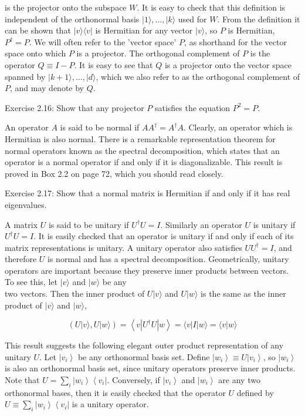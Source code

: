 \documentclass[
	11pt, %
	fleqn, %
	a4paper, %
]{LegrandOrangeBook}
\begin{document}
is the projector onto the subspace $W$. It is easy to check that this definition is independent of the orthonormal basis $|1\rangle, \ldots,|k\rangle$ used for $W$. From the definition it can be shown that $|v\rangle\langle v|$ is Hermitian for any vector $|v\rangle$, so $P$ is Hermitian, $P^{\dagger}=P$. We will often refer to the 'vector space' $P$, as shorthand for the vector space onto which $P$ is a projector. The orthogonal complement of $P$ is the operator $Q \equiv I-P$. It is easy to see that $Q$ is a projector onto the vector space spanned by $|k+1\rangle, \ldots,|d\rangle$, which we also refer to as the orthogonal complement of $P$, and may denote by $Q$.

Exercise 2.16: Show that any projector $P$ satisfies the equation $P^{2}=P$.

An operator $A$ is said to be normal if $A A^{\dagger}=A^{\dagger} A$. Clearly, an operator which is Hermitian is also normal. There is a remarkable representation theorem for normal operators known as the spectral decomposition, which states that an operator is a normal operator if and only if it is diagonalizable. This result is proved in Box 2.2 on page 72, which you should read closely.

Exercise 2.17: Show that a normal matrix is Hermitian if and only if it has real eigenvalues.

A matrix $U$ is said to be unitary if $U^{\dagger} U=I$. Similarly an operator $U$ is unitary if $U^{\dagger} U=I$. It is easily checked that an operator is unitary if and only if each of its matrix representations is unitary. A unitary operator also satisfies $U U^{\dagger}=I$, and therefore $U$ is normal and has a spectral decomposition. Geometrically, unitary operators are important because they preserve inner products between vectors. To see this, let $|v\rangle$ and $|w\rangle$ be any\\
two vectors. Then the inner product of $U|v\rangle$ and $U|w\rangle$ is the same as the inner product of $|v\rangle$ and $|w\rangle$,

$$
(U|v\rangle, U|w\rangle)=\left\langle v\left|U^{\dagger} U\right| w\right\rangle=\langle v|I| w\rangle=\langle v | w\rangle
$$

This result suggests the following elegant outer product representation of any unitary $U$. Let $\left|v_{i}\right\rangle$ be any orthonormal basis set. Define $\left|w_{i}\right\rangle \equiv U\left|v_{i}\right\rangle$, so $\left|w_{i}\right\rangle$ is also an orthonormal basis set, since unitary operators preserve inner products. Note that $U=\sum_{i}\left|w_{i}\right\rangle\left\langle v_{i}\right|$. Conversely, if $\left|v_{i}\right\rangle$ and $\left|w_{i}\right\rangle$ are any two orthonormal bases, then it is easily checked that the operator $U$ defined by $U \equiv \sum_{i}\left|w_{i}\right\rangle\left\langle v_{i}\right|$ is a unitary operator.
\end{document}
